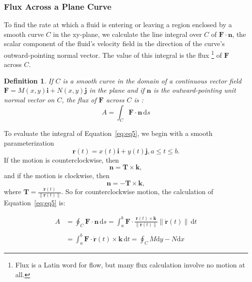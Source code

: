 \documentclass[a4paper,12pt]{article}
\newtheorem{definition}{Definition}
\begin{document}
\begin{CJK}{UTF8}{gbsn}
\subsubsection{Flux Across a Plane Curve}
To find the rate at which a fluid is entering or leaving a region enclosed
by a smooth curve $C$ in the xy-plane, we calculate the line integral over 
$C$ of $\bm{F}\cdot\bm{n}$, the scalar component of the fluid's velocity 
field in the direction of the curve's outward-pointing normal vector.
The value of this integral is the flux \footnote{Flux is a Latin word for flow,
but many flux calculation involve no motion at all.}
of $\bm{F}$ across $C$.

\begin{definition}
    If $C$ is a smooth curve in the domain of a continuous vector field 
    $\bm{F} = M(x,y)\bm{i} + N(x,y)\bm{j}$ in the plane and 
    if $\bm{n}$ is the outward-pointing unit normal vector on $C$, the 
    flux of $\bm{F}$ across $C$ is :
    \begin{equation}
        A = \int_C \bm{F}\cdot\bm{n}\, \mathrm{d}s
        \label{eq:eq5}
    \end{equation}
\end{definition}

To evaluate the integral of Equation~\ref{eq:eq5}, we begin with a smooth 
parameterization 
\[
    \bm{r}(t) = x(t)\bm{i} + y(t)\bm{j}, a \le t \le b.
\]
If the motion is counterclockwise, then 
\[
    \bm{n} = \bm{T} \times \bm{k},
\]
and if the motion is clockwise, then 
\[
    \bm{n} = -\bm{T} \times \bm{k},
\]
where $\displaystyle \bm{T} = \frac{\dot{\bm{r}}(t)}{\|\bm{r}(t)\|}$.
So for counterclockwise motion, the calculation of Equation~\ref{eq:eq5} is:

\begin{equation}
    \begin{split}
        A & = \oint_C \bm{F}\cdot\bm{n}\, \mathrm{d}s
            = \int_a^b \bm{F}\cdot \frac{\dot{\bm{r}}(t) \times \bm{k}}{\|\dot{\bm{r}}(t)\|}
              \|\dot{\bm{r}}(t)\|\,\mathrm{d}t\\
              \\
          & = \int_a^b \bm{F}\cdot \dot{\bm{r}}(t) \times \bm{k}\,\mathrm{d}t
            = \oint_C M\mathrm{d}y - N\mathrm{d}x
    \end{split}
\end{equation}


\end{CJK}
\end{document}
